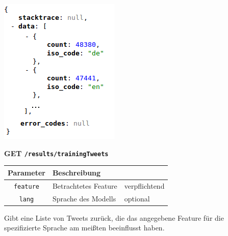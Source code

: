 \includegraphics[scale=0.6]{Bilder/RestApi/resultLanguages.png}

\noindent
\textbf{GET \texttt{/results/trainingTweets}}
\begin{table}[h!]
\begin{tabular}{| c | p{\tweite} | l |}
\hline
	\textbf{Parameter} & \textbf{Beschreibung} &  \\
\hline \hline
 	\texttt{feature} & Betrachtetes Feature & verpflichtend \\
\hline
 	\texttt{lang} & Sprache des Modells & optional \\
\hline
\end{tabular}
\end{table}
\newline
Gibt eine Liste von Tweets zurück, die das angegebene Feature für die spezifizierte Sprache am meißten beeinflusst haben.

